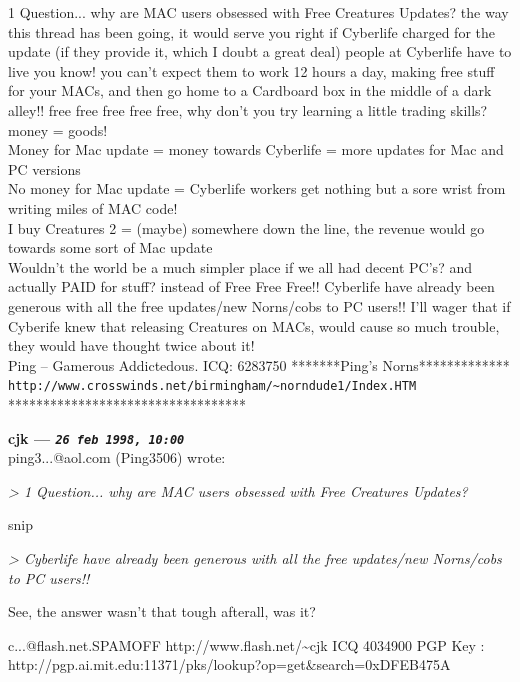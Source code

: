 \documentclass[11pt,twoside,a4paper]{article}
\begin{document}
\begin{multicols*}{2}
1 Question... why are MAC users obsessed with Free Creatures Updates? the way this thread has been going, it would serve you right if Cyberlife charged for the update (if they provide it, which I doubt a great deal) people at Cyberlife have to live you know! you can't expect them to work 12 hours a day, making free stuff for your MACs, and then go home to a Cardboard box in the middle of a dark alley!! free free free free free, why don't you try learning a little trading skills? money = goods!~\\

Money for Mac update = money towards Cyberlife = more updates for Mac and PC versions~\\

No money for Mac update = Cyberlife workers get nothing but a sore wrist from writing miles of MAC code!~\\

I buy Creatures 2 = (maybe) somewhere down the line, the revenue would go towards some sort of Mac update~\\

Wouldn't the world be a much simpler place if we all had decent PC's? and actually PAID for stuff? instead of Free Free Free!! Cyberlife have already been generous with all the free updates/new Norns/cobs to PC users!! I'll wager that if Cyberife knew that releasing Creatures on MACs, would cause so much trouble, they would have thought twice about it!~\\

Ping -- Gamerous Addictedous.
ICQ:  6283750
*******Ping's Norns*************
\texttt{http://www.crosswinds.net/birmingham/\textasciitilde norndude1/Index.HTM}~\\
**********************************

 
		
	
		
\textbf{cjk --- \emph{\texttt{26 feb 1998, 10:00}}}~\\

ping3...@aol.com (Ping3506) wrote:

\emph{> 1 Question... why are MAC users obsessed with Free Creatures Updates?}

{snip}

\emph{> Cyberlife have already been generous with all the free updates/new Norns/cobs to PC users!!}

See, the answer wasn't that tough afterall, was it?

c...@flash.net.SPAMOFF       http://www.flash.net/\textasciitilde cjk         ICQ 4034900
PGP Key : http://pgp.ai.mit.edu:11371/pks/lookup?op=get\&search=0xDFEB475A



\end{multicols*}
\end{document}
